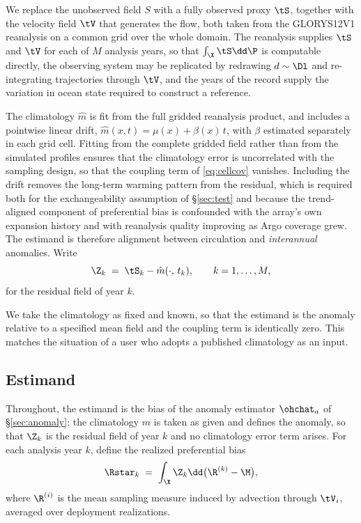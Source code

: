 We replace the unobserved field $S$ with a fully observed proxy $\tS$, together
with the velocity field $\tV$ that generates the flow, both taken from the
GLORYS12V1 reanalysis on a common grid over the whole domain. The reanalysis
supplies $\tS$ and $\tV$ for each of $M$ analysis years, so that
$\int_\X \tS \dd\P$ is computable directly, the observing system may be
replicated by redrawing $d \sim \Dl$ and re-integrating trajectories through
$\tV$, and the years of the record supply the variation in ocean state required
to construct a reference.

The climatology $\hat m$ is fit from the full gridded reanalysis product, and
includes a pointwise linear drift, $\hat m(x,t) = \mu(x) + \beta(x)\,t$, with
$\beta$ estimated separately in each grid cell. Fitting from the complete
gridded field rather than from the simulated profiles ensures that the
climatology error is uncorrelated with the sampling design, so that the coupling
term of \eqref{eq:cellcov} vanishes. Including the drift removes the
long-term warming pattern from the residual, which is required both for the
exchangeability assumption of \S\ref{sec:test} and because the trend-aligned
component of preferential bias is confounded with the array's own expansion
history and with reanalysis quality improving as Argo coverage grew. The
estimand is therefore alignment between circulation and \emph{interannual}
anomalies. Write
\begin{equation}
  \Z_k \;=\; \tS_k - \hat m(\cdot,\, t_k), \qquad k = 1,\ldots,M ,
\end{equation}
for the residual field of year $k$.

We take the climatology as fixed and known, so that the estimand is the anomaly relative to a specified mean field and the coupling term is identically zero. This matches the situation of a user who adopts a published climatology as an input.

\subsection{Estimand}

Throughout, the estimand is the bias of the anomaly estimator $\ohchat_a$ of
\S\ref{sec:anomaly}: the climatology $\hat m$ is taken as given and defines the
anomaly, so that $\Z_k$ is the residual field of year $k$ and no climatology
error term arises. For each analysis year $k$, define the realized preferential
bias
\begin{equation}
  \label{eq:thetastar}
  \Rstar_k \;=\; \int_\X \Z_k \dd\big(\R^{(k)} - \M\big) ,
\end{equation}
where $\R^{(i)}$ is the mean sampling measure induced by advection through
$\tV_i$, averaged over deployment realizations.

